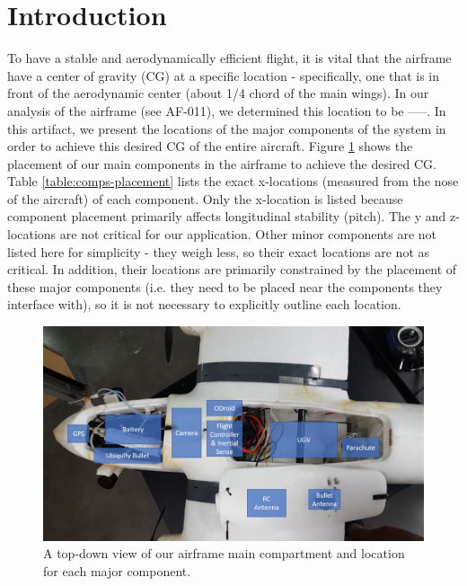 \documentclass[]{auvsi_doc}
\begin{document}
	\begin{AUVSITitlePage}
		\begin{artifacttable}
		\end{artifacttable}
	\end{AUVSITitlePage}

	\section{Introduction}
	To have a stable and aerodynamically efficient flight, it is vital that the airframe have a center of gravity (CG) at a specific location - specifically, one that is in front of the aerodynamic center (about 1/4 chord of the main wings). In our analysis of the airframe (see AF-011), we determined this location to be -----. In this artifact, we present the locations of the major components of the system in order to achieve this desired CG of the entire aircraft. Figure \ref{} shows the placement of our main components in the airframe to achieve the desired CG. Table \ref{table:comps-placement} lists the exact x-locations (measured from the nose of the aircraft) of each component. Only the x-location is listed because component placement primarily affects longitudinal stability (pitch). The y and z-locations are not critical for our application. Other minor components are not listed here for simplicity - they weigh less, so their exact locations are not as critical. In addition, their locations are primarily constrained by the placement of these major components (i.e. they need to be placed near the components they interface with), so it is not necessary to explicitly outline each location. 

	\begin{figure}[h!]
		\centering
		\label{fig:comps}
		\includegraphics[width=.9\columnwidth]{comps}
		\caption{A top-down view of our airframe main compartment and location for each major component.}		
	\end{figure}
\end{document}
